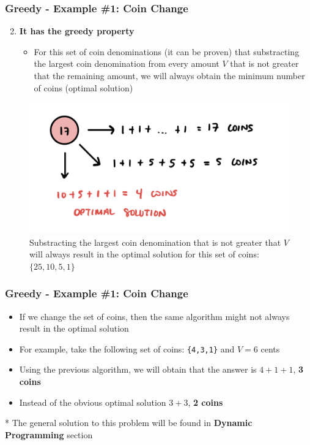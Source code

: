 \documentclass{beamer}
\begin{document}
\begin{frame}[fragile]
\frametitle{Greedy - Example \#1: Coin Change}

\begin{enumerate}
	\setcounter{enumi}{1}
    \item \textbf{It has the greedy property}    
    	\begin{itemize}
		    \item For this set of coin denominations (it can be proven) that substracting the largest coin denomination from every amount $V$ that is not greater that the remaining amount, we will always obtain the minimum number of coins (optimal solution)
		\end{itemize}
\end{enumerate}

\begin{figure}
    \centering
    \includegraphics[scale=0.2]{imgs/coin_change_2.jpeg}
    \caption{Substracting the largest coin denomination that is not greater that $V$ will always result in the optimal solution for this set of coins: $\{25,10,5,1\}$}
\end{figure}

\end{frame}

\begin{frame}[fragile]
\frametitle{Greedy - Example \#1: Coin Change}

\begin{itemize}
    \item If we change the set of coins, then the same algorithm might not always result in the optimal solution
    \item For example, take the following set of coins: \verb|{4,3,1}| and $V=6$ cents
    \item Using the previous algorithm, we will obtain that the answer is $4+1+1$, \textbf{3 coins}
    \item Instead of the obvious optimal solution $3+3$, \textbf{2 coins}
\end{itemize}

\vspace{0.3cm}

\color{blue}* The general solution to this problem will be found in \textbf{Dynamic Programming} section\color{black}

\end{frame}
\end{document}

